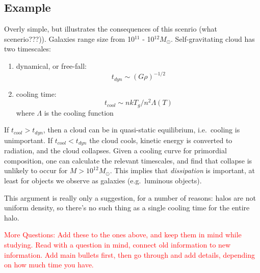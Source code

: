 \documentclass[12pt]{article}
\begin{document}
\subsection*{Example}
Overly simple, but illustrates the consequences of
this scenrio (what scenerio???)). Galaxies range size from
10$^{11}$ - 10$^{12} M_{\odot}$.
Self-gravitating cloud has two timescales:
\begin{enumerate}[1.]
        \item dynamical, or free-fall:
            $$ t_{dyn} \sim (G\rho)^{-1/2} $$
        \item cooling time:
            $$ t_{cool} \sim nkT_g/n^2\Lambda(T) $$
            where $\Lambda$ is the cooling function
\end{enumerate}
If $t_{cool} > t_{dyn}$, then a cloud can be in quasi-static
equilibrium, i.e.\ cooling is unimportant. If $t_{cool} < t_{dyn}$
the cloud cools, kinetic energy is converted to radiation, and
the cloud collapses. Given a cooling curve for primordial
composition, one can calculate the relevant timescales, and find
that collapse is unlikely to occur for $M > 10^{12}M_{\odot}$.
This implies that \emph{dissipation} is important, at least for
objects we observe as galaxies (e.g.\ luminous objects).

This argument is really only a suggestion, for a number of reasons:
halos are not uniform density, so there's no such thing as a single
cooling time for the entire halo.

\textcolor{red}{More Questions: Add these to the ones above, and keep them in mind
while studying. Read with a question in mind, connect old
information to new information. Add main bullets first, then go
through and add details, depending on how much time you have.}
\end{document}
